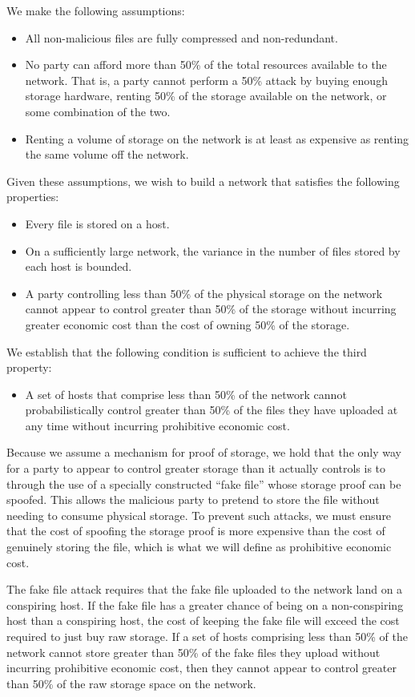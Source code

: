 \documentclass[twocolumn]{article}
\begin{document}
We make the following assumptions:
\begin{itemize}
	\item All non-malicious files are fully compressed and non-redundant.
	\item No party can afford more than 50\% of the total resources available to the network. That is, a party cannot perform a 50\% attack by buying enough storage hardware, renting 50\% of the storage available on the network, or some combination of the two.
	\item Renting a volume of storage on the network is at least as expensive as renting the same volume off the network.
\end{itemize}

Given these assumptions, we wish to build a network that satisfies the following properties:
\begin{itemize}
	\item Every file is stored on a host.
	\item On a sufficiently large network, the variance in the number of files stored by each host is bounded.
	\item A party controlling less than 50\% of the physical storage on the network cannot appear to control greater than 50\% of the storage without incurring greater economic cost than the cost of owning 50\% of the storage.
\end{itemize}

We establish that the following condition is sufficient to achieve the third property:
\begin{itemize}
	\item A set of hosts that comprise less than 50\% of the network cannot probabilistically control greater than 50\% of the files they have uploaded at any time without incurring prohibitive economic cost.
\end{itemize}
Because we assume a mechanism for proof of storage, we hold that the only way for a party to appear to control greater storage than it actually controls is to through the use of a specially constructed ``fake file'' whose storage proof can be spoofed.
This allows the malicious party to pretend to store the file without needing to consume physical storage.
To prevent such attacks, we must ensure that the cost of spoofing the storage proof is more expensive than the cost of genuinely storing the file, which is what we will define as prohibitive economic cost.

The fake file attack requires that the fake file uploaded to the network land on a conspiring host.
If the fake file has a greater chance of being on a non-conspiring host than a conspiring host, the cost of keeping the fake file will exceed the cost required to just buy raw storage.
If a set of hosts comprising less than 50\% of the network cannot store greater than 50\% of the fake files they upload without incurring prohibitive economic cost, then they cannot appear to control greater than 50\% of the raw storage space on the network.
\end{document}
